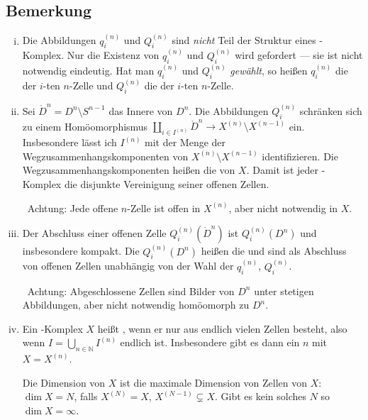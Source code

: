 \subsection[Bemerkungen zur Definition von \CW-Komplexen]{Bemerkung} %
\label{sub:113}
\begin{enumerate}[(i)]
	\item Die Abbildungen $q_i^{(n)}$ und $Q_i^{(n)}$ sind \emph{nicht} Teil der Struktur eines \CW-Komplex. Nur die Existenz von $q_i^{(n)}$ und $Q_i^{(n)}$ wird 
	gefordert --- sie ist nicht notwendig eindeutig. Hat man $q_i^{(n)}$ und $Q_i^{(n)}$ \emph{gewählt}, so heißen $q_i^{(n)}$ die  der $i$-ten
	$n$-Zelle und $Q_i^{(n)}$ die  der $i$-ten $n$-Zelle.
	\item Sei $\mathring{D}^n = D^n \setminus S^{n-1}$ das Innere von $D^n$. Die Abbildungen $Q_i^{(n)}$ schränken sich zu einem Homöomorphismus 
	$\coprod_{i \in I^{(n)}} \mathring{D}^n \to X^{(n)} \setminus X^{(n-1)}$ ein. Insbesondere lässt ich $I^{(n)}$ mit der Menge der Wegzusammenhangskomponenten von 
	$X^{(n)} \setminus X^{(n-1)}$ identifizieren. Die Wegzusammenhangskomponenten heißen die  von $X$. Damit ist jeder \CW-Komplex 
	die disjunkte Vereinigung seiner offenen Zellen.
	
	\ifxetexorluatex \faWarningSign \, \fi Achtung: Jede offene $n$-Zelle ist offen in $X^{(n)}$, aber nicht notwendig in $X$.
	\item Der Abschluss einer offenen Zelle $Q_i^{(n)}(\mathring{D}^n)$ ist $Q_i^{(n)}(D^n)$ und insbesondere kompakt. Die $Q_i^{(n)}(D^n)$ heißen die
	 und sind als Abschluss von offenen Zellen unabhängig von der Wahl der $q_i^{(n)}$, $Q_i^{(n)}$.
	
	\ifxetexorluatex \faWarningSign \, \fi Achtung: Abgeschlossene Zellen sind Bilder von $D^n$ unter stetigen Abbildungen, aber nicht notwendig homöomorph zu $D^n$.
	\item Ein \CW-Komplex $X$ heißt , wenn er nur aus endlich vielen Zellen besteht, also wenn 
	$I = \bigcup_{n \in \mathds{N} } I^{(n)}$ endlich ist. Insbesondere gibt es dann ein $n$ mit $X=X^{(n)}$.
	
	Die Dimension von $X$ ist die maximale Dimension von Zellen von $X$: $\dim X = N$, falls $X^{(N)}=X$, $X^{(N-1)} \subsetneq X$. Gibt es kein solches $N$ so
	$\dim X = \infty$.
\end{enumerate}

